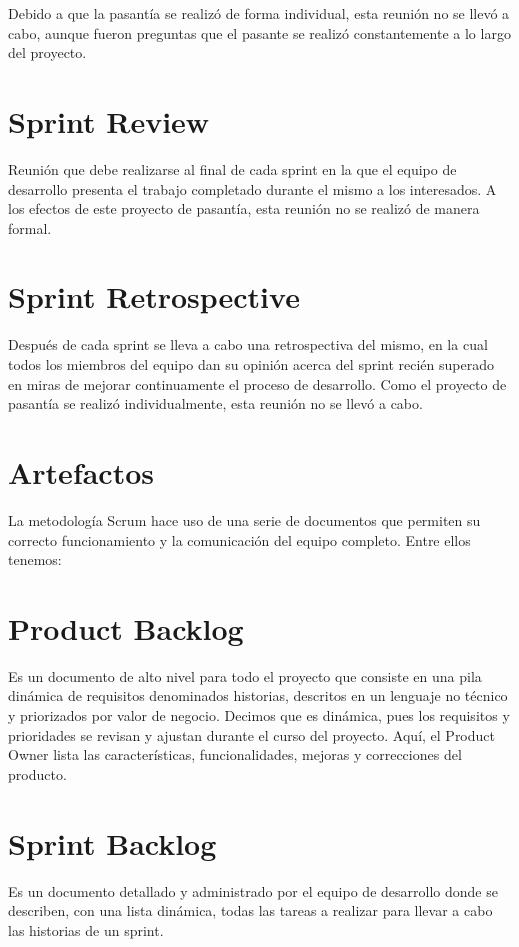 Debido a que la pasantía se realizó de forma individual, esta reunión no se llevó a cabo, aunque fueron preguntas que el pasante se realizó constantemente a lo largo del proyecto.

\section{Sprint Review}
Reunión que debe realizarse al final de cada sprint en la que el equipo de desarrollo presenta el trabajo completado durante el mismo a los interesados.
A los efectos de este proyecto de pasantía, esta reunión no se realizó de manera formal.

\section{Sprint Retrospective}
Después de cada sprint se lleva a cabo una retrospectiva del mismo, en la cual todos los miembros del equipo dan su opinión acerca del sprint recién superado en miras de mejorar continuamente el proceso de desarrollo. Como el proyecto de pasantía se realizó individualmente, esta reunión no se llevó a cabo.

\section{Artefactos}
La metodología Scrum hace uso de una serie de documentos que permiten su correcto funcionamiento y la comunicación del equipo completo. Entre ellos tenemos:

\section{Product Backlog}
Es un documento de alto nivel para todo el proyecto que consiste en una pila dinámica de requisitos denominados historias, descritos en un lenguaje no técnico y priorizados por valor de negocio. Decimos que es dinámica, pues los requisitos y prioridades se revisan y ajustan durante el curso del proyecto. Aquí, el Product Owner lista las características, funcionalidades, mejoras y correcciones del producto.

\section{Sprint Backlog}
Es un documento detallado y administrado por el equipo de desarrollo donde se describen, con una lista dinámica, todas las tareas a realizar para llevar a cabo las historias de un sprint.

